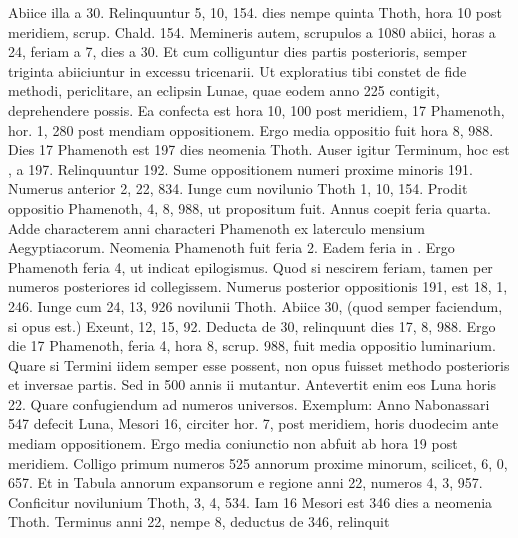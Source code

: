Abiice illa a 30.
%
Relinquuntur 5, 10, 154. %
 dies nempe quinta Thoth, hora 10 post
meridiem, scrup. %
 Chald. %
 154.
Memineris autem, scrupulos a 1080
abiici, horas a 24, feriam a 7, dies a 30.
Et cum colliguntur dies
partis posterioris, semper triginta abiiciuntur in excessu tricenarii.
Ut
exploratius tibi constet de fide methodi, periclitare, an eclipsin Lunae,
quae eodem anno 225 contigit, deprehendere possis.
Ea confecta
est hora 10, 100 post meridiem, 17 Phamenoth, hor. %
 1, 280
post mendiam oppositionem.
Ergo media oppositio fuit hora 8, 988.
Dies 17 Phamenoth est 197 dies neomenia Thoth.
Auser igitur
Terminum, hoc est , a 197.
Relinquuntur 192.
Sume oppositionem
numeri proxime minoris 191.
Numerus anterior 2, 22, 834.
Iunge cum novilunio Thoth 1, 10, 154.
Prodit oppositio Phamenoth,
4, 8, 988, ut propositum fuit.
Annus coepit feria quarta.
Adde
characterem anni characteri Phamenoth ex laterculo mensium
Aegyptiacorum.
Neomenia Phamenoth fuit feria 2. %
Eadem feria in .
Ergo  Phamenoth feria 4, ut indicat epilogismus.
Quod si nescirem
feriam, tamen per numeros posteriores id collegissem.
Numerus
posterior oppositionis 191, est 18, 1, 246.
Iunge cum 24, 13, 926
novilunii Thoth.
Abiice 30, (quod semper faciendum, si opus est.) %
Exeunt, 12, 15, 92.
Deducta de 30, relinquunt dies 17, 8, 988.
Ergo
die 17 Phamenoth, feria 4, hora 8, scrup. %
 988, fuit media oppositio
luminarium.
Quare si Termini iidem semper esse possent, non
opus fuisset methodo posterioris et inversae partis.
Sed in 500 annis
ii mutantur.
Antevertit enim eos Luna horis 22.
Quare confugiendum
ad numeros universos.
Exemplum: Anno Nabonassari 547
defecit Luna, Mesori 16, circiter hor. %
 7, post meridiem, horis
duodecim ante mediam oppositionem.
Ergo media coniunctio non
abfuit ab hora 19 post meridiem.
Colligo primum numeros 525
annorum proxime minorum, scilicet, 6, 0, 657. %
Et in Tabula annorum
expansorum e regione anni 22, numeros 4, 3, 957.
Conficitur
novilunium Thoth, 3, 4, 534.
Iam 16 Mesori est 346 dies a neomenia
Thoth.
Terminus anni 22, nempe 8, deductus de 346, relinquit
